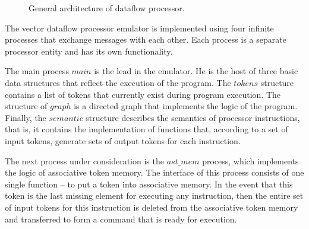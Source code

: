 \documentclass[
11pt,%
tightenlines,%
twoside,%
onecolumn,%
nofloats,%
nobibnotes,%
nofootinbib,%
superscriptaddress,%
noshowpacs,%
centertags]%
{revtex4}
\begin{document}
\begin{figure}[h!]
\setcaptionmargin{5mm}
\onelinecaptionsfalse
{}
\caption{General architecture of dataflow processor.}
\label{fig:big-scheme}
\end{figure}

The vector dataflow processor emulator is implemented using four infinite processes that exchange messages with each other.
Each process is a separate processor entity and has its own functionality.

The main process $main$ is the lead in the emulator.
He is the host of three basic data structures that reflect the execution of the program.
The $tokens$ structure contains a list of tokens that currently exist during program execution.
The structure of $graph$ is a directed graph that implements the logic of the program.
Finally, the $semantic$ structure describes the semantics of processor instructions, that is, it contains the implementation of functions that, according to a set of input tokens, generate sets of output tokens for each instruction.

The next process under consideration is the $ast\_mem$ process, which implements the logic of associative token memory.
The interface of this process consists of one single function -- to put a token into associative memory.
In the event that this token is the last missing element for executing any instruction, then the entire set of input tokens for this instruction is deleted from the associative token memory and transferred to form a command that is ready for execution.
\end{document}
